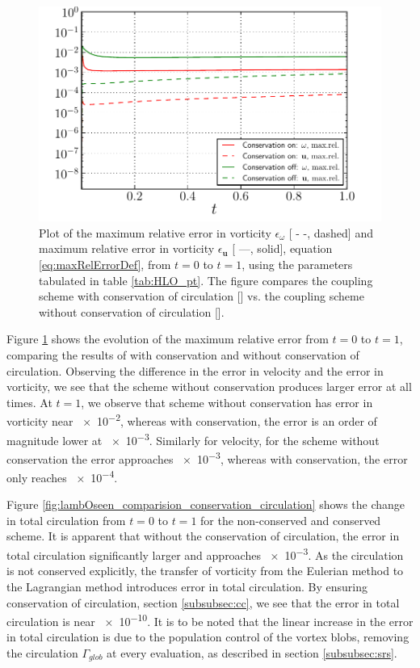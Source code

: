 	\begin{figure}[!p]
	\centering
	\includegraphics[width=0.6\linewidth]{./figures/hybrid/lambOseent2/lambOseen_comparision_conservation_compressed.pdf}
	\caption{Plot of the maximum relative error in vorticity $\epsilon_{\omega}$ [ - -, dashed] and maximum relative error in vorticity $\epsilon_{\mathbf{u}}$ [ ---, solid], equation \ref{eq:maxRelErrorDef}, from $t=0$ to $t=1$, using the parameters tabulated in table \ref{tab:HLO_pt}. The figure compares the coupling scheme with conservation of circulation [{}] vs. the coupling scheme without conservation of circulation [{}].}
	\label{fig:lambOseen_comparision_conservation}
	\end{figure}	

Figure \ref{fig:lambOseen_comparision_conservation} shows the evolution of the maximum relative error from $t=0$ to $t=1$, comparing the results of with conservation and without conservation of circulation. Observing the difference in the error in velocity and the error in vorticity, we see that the scheme without conservation produces larger error at all times. At $t=1$, we observe that scheme without conservation has error in vorticity near \num{e-2}, whereas with conservation, the error is an order of magnitude lower at \num{e-3}. Similarly for velocity, for the scheme without conservation the error approaches \num{e-3}, whereas with conservation, the error only reaches \num{e-4}. 

Figure \ref{fig:lambOseen_comparision_conservation_circulation} shows the change in total circulation from $t=0$ to $t=1$ for the non-conserved and conserved scheme. It is apparent that without the conservation of circulation, the error in total circulation significantly larger and approaches \num{e-3}. As the circulation is not conserved explicitly, the transfer of vorticity from the Eulerian method to the Lagrangian method introduces error in total circulation. By ensuring conservation of circulation, section \ref{subsubsec:cc}, we see that the error in total circulation is near \num{e-10}. It is to be noted that the linear increase in the error in total circulation is due to the population control of the vortex blobs, removing the circulation $\Gamma_{glob}$ at every evaluation, as described in section \ref{subsubsec:srs}.


